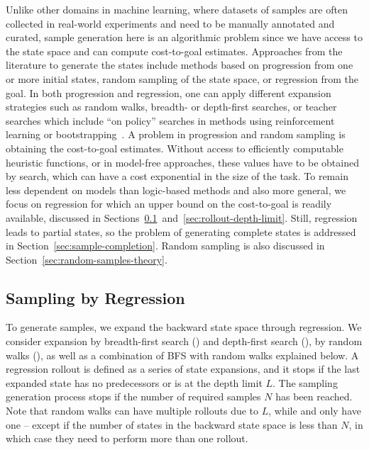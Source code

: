 Unlike other domains in machine learning, where datasets of samples are often collected in real-world experiments and need to be manually annotated and curated, sample generation here is an algorithmic problem since we have access to the state space and can compute cost-to-goal estimates. Approaches from the literature to generate the states include methods based on progression from one or more initial states, random sampling of the state space, or regression from the goal. In both progression and regression, one can apply different expansion strategies such as random walks, breadth- or depth-first searches, or teacher searches which include ``on policy'' searches in methods using reinforcement learning or bootstrapping~\cite{Arfaee.etal/2011}. A problem in progression and random sampling is obtaining the cost-to-goal estimates. Without access to efficiently computable heuristic functions, or in model-free approaches, these values have to be obtained by search, which can have a cost exponential in the size of the task. To remain less dependent on models than logic-based methods and also more general, we focus on regression for which an upper bound on the cost-to-goal is readily available, discussed in Sections~\ref{sec:sampling-generation}~and~\ref{sec:rollout-depth-limit}. Still, regression leads to partial states, so the problem of generating complete states is addressed in Section~\ref{sec:sample-completion}. Random sampling is also discussed in Section~\ref{sec:random-samples-theory}.

\subsection{Sampling by Regression}
\label{sec:sampling-generation}

To generate samples, we expand the backward state space through regression. We consider expansion by breadth-first search (\bfs) and depth-first search (\dfs), by random walks (\rw), as well as a combination of BFS with random walks explained below. A regression rollout is defined as a series of state expansions, and it stops if the last expanded state has no predecessors or is at the depth limit $L$. The sampling generation process stops if the number of required samples $N$ has been reached. Note that random walks can have multiple rollouts due to $L$, while \bfs and \dfs only have one -- except if the number of states in the backward state space is less than $N$, in which case they need to perform more than one rollout.

